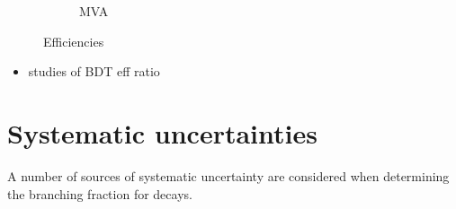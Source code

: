 \begin{figure}[!h]
\begin{subfigure}[t]{0.4\textwidth}
      \caption{MVA}
   \end{subfigure}
   \caption{Efficiencies}
   \label{fig:B2DsKK_dalitz_eff_two}
\end{figure}


{\color{Red}
\begin{itemize}
\item studies of BDT eff ratio 
\end{itemize}
}


\section{Systematic uncertainties}
\label{sec:B2DsKK_systuncertainy}


A number of sources of systematic uncertainty are considered when determining the branching fraction for \decay{\Bp}{\Dsp\Kp\Km} decays.
